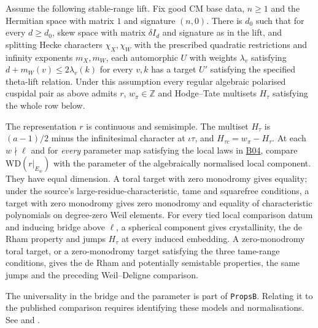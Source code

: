 \begin{formalstatement}\label{sub:B01}
Assume the following stable-range lift. Fix good CM base data, $n\ge1$ and
the Hermitian space with matrix $1$ and signature $(n,0)$. There is $d_0$
such that for every $d\ge d_0$, skew space with matrix $\delta I_d$ and
signature as in the lift, and splitting Hecke characters $\chi_X,\chi_W$
with the prescribed quadratic restrictions and infinity exponents $m_X,m_W$,
each automorphic $U$ with weights $\lambda_v$ satisfying
$d+m_W(v)\le2\lambda_v(k)$ for every $v,k$ has a target $U'$ satisfying
the specified theta-lift relation. Under this assumption every regular
algebraic polarised cuspidal pair as above admits $r$, $w_\pi\in\mathbb Z$
and Hodge--Tate multisets $H_\tau$ satisfying the whole row below.

The representation $r$ is continuous and semisimple. The multiset
$H_\tau$ is $(a-1)/2$ minus the infinitesimal character at $\iota\tau$,
and $H_{\tau c}=w_\pi-H_\tau$. At each $w\nmid\ell$ and for
\emph{every} parameter map satisfying the local laws in
\hyperref[sub:B04]{B04}, compare $\mathrm{WD}(r|_{E_w})$ with the parameter
of the algebraically normalised local component. They have equal dimension.
A toral target with zero monodromy gives equality; under the source's
large-residue-characteristic, tame and squarefree conditions, a target with
zero monodromy gives zero monodromy and equality of characteristic polynomials
on degree-zero Weil elements. For every tied local comparison datum and
inducing bridge above $\ell$, a spherical component gives crystallinity,
the de Rham property and jumps $H_\tau$ at every induced embedding.
A zero-monodromy toral target, or a zero-monodromy target satisfying the
three tame-range conditions, gives the de Rham and potentially semistable
properties, the same jumps and the preceding Weil--Deligne comparison.
\end{formalstatement}
The universality in the bridge and the parameter is part of
\nolinkurl{PropsB}. Relating it to the published comparison requires identifying
these models and normalisations. See 
and .

